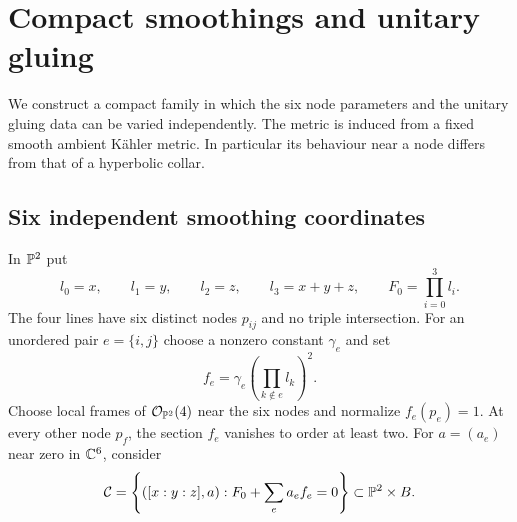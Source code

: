 \section{Compact smoothings and unitary gluing}\label{sec:geometry}

We construct a compact family in which the six node parameters and the
unitary gluing data can be varied independently. The metric is induced
from a fixed smooth ambient K\"ahler metric. In particular its behaviour
near a node differs from that of a hyperbolic collar.

\subsection{Six independent smoothing coordinates}
In $\mathbb P^2$ put
\[
 l_0=x,\qquad l_1=y,\qquad l_2=z,\qquad l_3=x+y+z,
 \qquad F_0=\prod_{i=0}^3l_i.
\]
The four lines have six distinct nodes $p_{ij}$ and no triple
intersection. For an unordered pair $e=\{i,j\}$ choose a nonzero
constant $\gamma_e$ and set
\[
 f_e=\gamma_e\left(\prod_{k\notin e}l_k\right)^2.
\]
Choose local frames of $\mathcal O_{\mathbb P^2}(4)$ near the six nodes
and normalize $f_e(p_e)=1$. At every other node $p_f$, the section
$f_e$ vanishes to order at least two. For $a=(a_e)$ near zero in
$\mathbb C^6$, consider
\begin{equation}\label{eq:quartic-family}
 \mathcal C=\left\{([x:y:z],a):
 F_0+\sum_e a_e f_e=0\right\}\subset\mathbb P^2\times B.
\end{equation}

